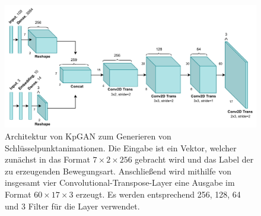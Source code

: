 \begin{figure}
    \includegraphics[width=\textwidth]{images/KpGAN.pdf}
    \caption{Architektur von KpGAN zum Generieren von Schlüs\-sel\-punkt\-anima\-tionen. Die Eingabe ist ein Vektor, welcher zunächst in das Format $7 \times 2 \times 256$ gebracht wird und das Label der zu erzeugenden Bewegungsart. Anschließend wird mithilfe von insgesamt vier Convolutional-Transpose-Layer eine Ausgabe im Format $60 \times 17 \times 3$ erzeugt. Es werden entsprechend 256, 128, 64 und 3 Filter für die Layer verwendet.}
    \label{fig:kpgan}
\end{figure}